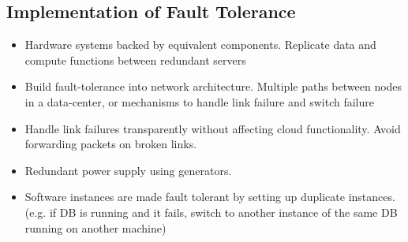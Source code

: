 \documentclass{article}
\begin{document}
\subsection{Implementation of Fault Tolerance}
\begin{itemize}
    \item Hardware systems backed by equivalent components. Replicate data and compute functions between redundant servers
    
    \item Build fault-tolerance into network architecture. Multiple paths between nodes in a data-center, or mechanisms to handle link failure and switch failure
    
    \item Handle link failures transparently without affecting cloud functionality. Avoid forwarding packets on broken links. 
    
    \item Redundant power supply using generators. 
    
    \item Software instances are made fault tolerant by setting up duplicate instances. (e.g. if DB is running and it fails, switch to another instance of the same DB running on another machine)

\end{itemize}
\end{document}
